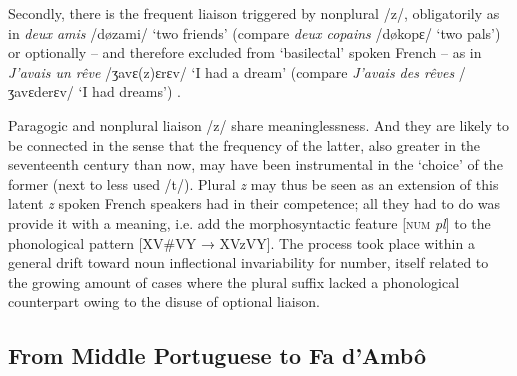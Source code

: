 \documentclass[output=paper]{langscibook}
\begin{document}
Secondly, there is the frequent liaison triggered by nonplural /z/, obligatorily as in \textit{deux amis} /døzami/ ‘two friends’ (compare \textit{deux copains} /døkopɛ/ ‘two pals’) or optionally – and therefore excluded from ‘basilectal’ spoken French – as in \textit{J’avais un rêve} /ʒavɛ(z)ɛrɛv/ ‘I had a dream’ (compare \textit{J’avais des rêves} /ʒavɛderɛv/ ‘I had dreams’) \citep{Encrevé1988}.

Paragogic and nonplural liaison /z/ share meaninglessness. And they are likely to be connected in the sense that the frequency of the latter, also greater in the seventeenth century than now, may have been instrumental in the ‘choice’ of the former (next to less used /t/). Plural \textit{z} may thus be seen as an extension of this latent \textit{z} spoken French speakers had in their competence; all they had to do was provide it with a meaning, i.e. add the morphosyntactic feature [\textsc{num} \textit{pl}] to the phonological pattern [XV\#VY → XVzVY]. The process took place within a general drift toward noun inflectional invariability for number, itself related to the growing amount of cases where the plural suffix lacked a phonological counterpart owing to the disuse of optional liaison.

\subsection{From Middle Portuguese to Fa d’Ambô}
\label{sec:kihm:5.2}
\end{document}
